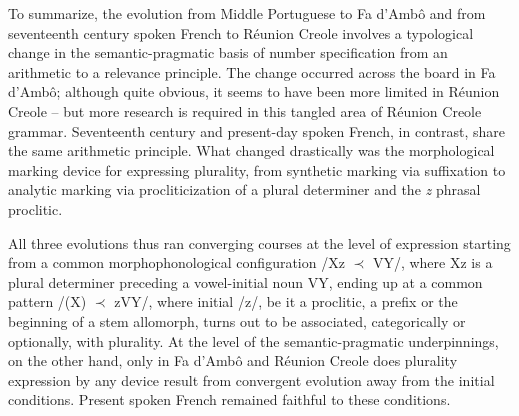 \documentclass[output=paper]{langscibook}
\begin{document}
\begin{sloppypar}
To summarize, the evolution from Middle Portuguese to Fa d’Ambô and from seventeenth century spoken French to Réunion Creole involves a typological change in the semantic-pragmatic basis of number specification from an arithmetic to a relevance principle. The change occurred across the board in Fa d’Ambô; although quite obvious, it seems to have been more limited in Réunion Creole -- but more research is required in this tangled area of Réunion Creole grammar. Seventeenth century and present-day spoken French, in contrast, share the same arithmetic principle. What changed drastically was the morphological marking device for expressing plurality, from synthetic marking via suffixation to analytic marking via procliticization of a plural determiner and the \textit{z} phrasal proclitic.
\end{sloppypar}

All three evolutions thus ran converging courses at the level of expression starting from a common morphophonological configuration /Xz ${\prec}$ VY/, where Xz is a plural determiner preceding a vowel-initial noun VY, ending up at a common pattern /(X) ${\prec}$ zVY/, where initial /z/, be it a proclitic, a prefix or the beginning of a stem allomorph, turns out to be associated, categorically or optionally, with plurality. At the level of the semantic-pragmatic underpinnings, on the other hand, only in Fa d’Ambô and Réunion Creole does plurality expression by any device result from convergent evolution away from the initial conditions. Present spoken French remained faithful to these conditions.
\end{document}
